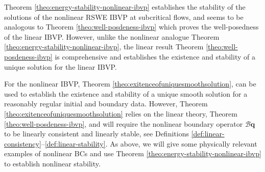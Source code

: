 \documentclass{article}
\numberwithin{equation}{section}
\theoremstyle{definition}
\begin{document}
Theorem \ref{theo:energy-stability-nonlinear-ibvp} establishes the stability of the solutions of the nonlinear RSWE IBVP  at subcritical flows, and seems to be analogous to Theorem \ref{theo:well-posdeness-ibvp} which proves the well-posedness of the linear IBVP. However, unlike the nonlinear analogue Theorem  \ref{theo:energy-stability-nonlinear-ibvp}, the linear result Theorem  \ref{theo:well-posdeness-ibvp} is comprehensive and establishes the existence and stability of a unique solution for the linear IBVP.

For the nonlinear IBVP, Theorem \ref{theo:exitenceofuniquesmoothsolution}, can be used to establish the existence and stability of a unique smooth solution for a reasonably regular initial and boundary data. However, Theorem \ref{theo:exitenceofuniquesmoothsolution} relies on the linear theory, Theorem  \ref{theo:well-posdeness-ibvp}, and will require the nonlinear boundary operator $\mathcal{B}\mathbf{q}$ to be  linearly consistent and linearly stable, see Definitions \ref{def:linear-consistency}--\ref{def:linear-stability}. As above, we will give some physically relevant examples of nonlinear BCs and use Theorem  \ref{theo:energy-stability-nonlinear-ibvp} to establish nonlinear stability.
\end{document}
